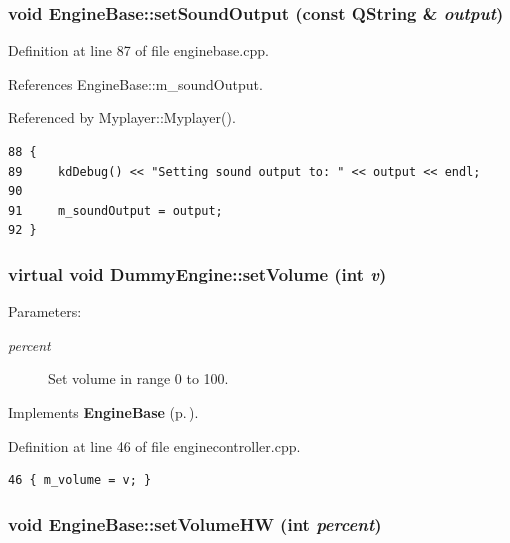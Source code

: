 \subsubsection{\setlength{\rightskip}{0pt plus 5cm}void Engine\-Base::set\-Sound\-Output (const QString \& {\em output})\hspace{0.3cm}{\tt  [virtual, inherited]}}\label{classEngineBase_EngineBasea25}




Definition at line 87 of file enginebase.cpp.

References Engine\-Base::m\_\-sound\-Output.

Referenced by Myplayer::Myplayer().



\footnotesize\begin{verbatim}88 {
89     kdDebug() << "Setting sound output to: " << output << endl;
90     
91     m_soundOutput = output;
92 }
\end{verbatim}\normalsize 
{}
\subsubsection{\setlength{\rightskip}{0pt plus 5cm}virtual void Dummy\-Engine::set\-Volume (int {\em v})\hspace{0.3cm}{\tt  [inline, private, virtual]}}\label{classDummyEngine_DummyEngined12}


\begin{Desc}
\item[Parameters:]
\begin{description}
\item[{\em percent}]Set volume in range 0 to 100. \end{description}
\end{Desc}


Implements {\bf Engine\-Base} {\rm (p.\,\pageref{classEngineBase_EngineBasei4})}.

Definition at line 46 of file enginecontroller.cpp.



\footnotesize\begin{verbatim}46 { m_volume = v; }
\end{verbatim}\normalsize 
{}
\subsubsection{\setlength{\rightskip}{0pt plus 5cm}void Engine\-Base::set\-Volume\-HW (int {\em percent})\hspace{0.3cm}{\tt  [protected, inherited]}}\label{classEngineBase_EngineBaseb2}





